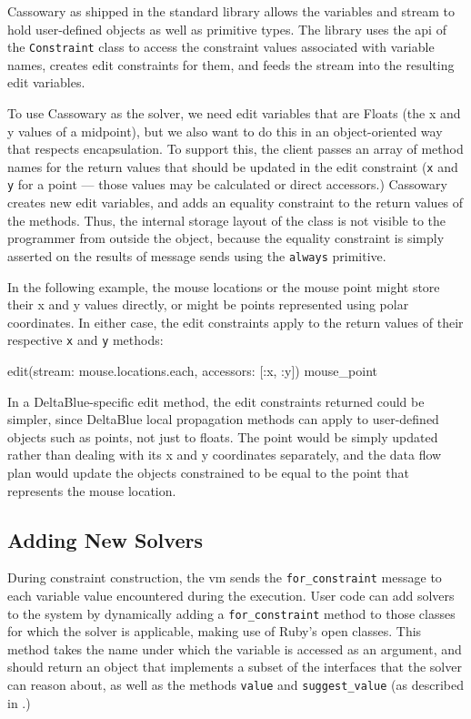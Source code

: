 Cassowary as shipped in the \toolname standard library allows the
variables and stream to hold user-defined objects as well as primitive
types. The library uses the \ac{api} of the \lstinline{Constraint}
class to access the constraint values associated with variable names,
creates edit constraints for them, and feeds the stream into the
resulting edit variables.

To use Cassowary as the solver, we need edit variables that are Floats
(\eg the x and y values of a midpoint), but we also want to do this in
an object-oriented way that respects encapsulation. To support this,
the client passes an array of method names for the return values that
should be updated in the edit constraint (\eg \lstinline{x} and
\lstinline{y} for a point --- those values may be calculated or direct
accessors.)  Cassowary creates new edit variables, and adds an
equality constraint to the return values of the methods. Thus, the
internal storage layout of the class is not visible to the programmer
from outside the object, because the
equality constraint is simply asserted on the results of message sends
using the \lstinline{always} primitive.

In the following example, the mouse locations or the mouse point might
store their x and y values directly, or might be points represented
using polar coordinates.  In either case, the edit constraints apply
to the return values of their respective \lstinline{x} and \lstinline{y}
methods:
\begin{code}[numbers=none]
edit(stream: mouse.locations.each, accessors: [:x, :y]) { mouse_point }
\end{code}

In a DeltaBlue-specific edit method, the edit constraints returned
could be simpler, since DeltaBlue local propagation methods can apply
to user-defined objects such as points, not just to floats.
The point would be simply updated rather than
dealing with its x and y coordinates separately, and the data flow
plan would update the objects constrained to be equal to the point
that represents the mouse location.

\subsection{Adding New Solvers}
\label{sec:solver-interface}
During constraint construction, the \ac{vm} sends the
\lstinline{for_constraint} message to each variable value encountered during
the execution. User code can add solvers to the system by dynamically
adding a \lstinline{for_constraint} method to those classes for which the
solver is applicable, making use of Ruby's open classes. This method
takes the name under which the variable is accessed as an argument,
and should return an object that implements a subset of the interfaces
that the solver can reason about, as well as the methods
\lstinline{value} and \lstinline{suggest_value} (as described in
.)


